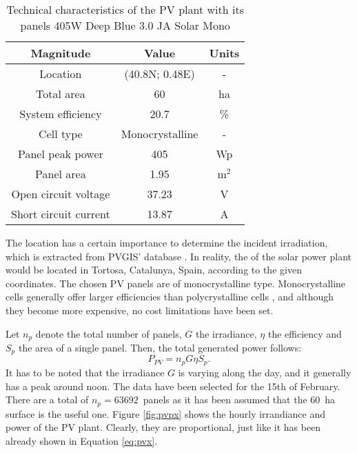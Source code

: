 \begin{table}[!htb]\centering
  \begin{tabular}{ccc}
    \hline
    \textbf{Magnitude} & \textbf{Value} & \textbf{Units}\\
    \hline
    Location & (40.8N; 0.48E) & -\\
    Total area & 60 & ha \\
    System efficiency & 20.7 & \% \\
    Cell type & Monocrystalline & - \\
    Panel peak power & 405 & Wp \\
    Panel area & 1.95 & m$^2$ \\
    Open circuit voltage & 37.23 & V \\
    Short circuit current & 13.87 & A \\
    \hline
  \end{tabular}
  \caption{Technical characteristics of the PV plant with its panels 405W Deep Blue 3.0 JA Solar Mono \cite{autosolar}}
  \label{tab:pv}
\end{table}
The location has a certain importance to determine the incident irradiation, which is extracted from PVGIS' database \cite{pvgis}. In reality, the of the solar power plant would be located in Tortosa, Catalunya, Spain, according to the given coordinates. The chosen PV panels are of monocrystalline type. Monocrystalline cells generally offer larger efficiencies than polycrystalline cells \cite{kumar2015comparative}, and although they become more expensive, no cost limitations have been set. 

Let $n_p$ denote the total number of panels, $G$ the irradiance, $\eta$ the efficiency and $S_p$ the area of a single panel. Then, the total generated power follows:
 \begin{equation}
   P_{PV} = n_p G \eta S_p.
   \label{eq:pvx}
\end{equation}
It has to be noted that the irradiance $G$ is varying along the day, and it generally has a peak around noon. The data have been selected for the 15th of February. There are a total of $n_p=63692$~panels as it has been assumed that the 60~ha surface is the useful one. Figure \ref{fig:pvpx} shows the hourly irrandiance and power of the PV plant. Clearly, they are proportional, just like it has been already shown in Equation \ref{eq:pvx}.

